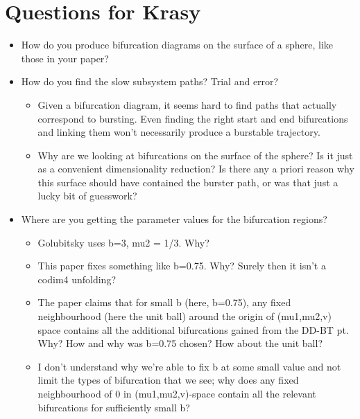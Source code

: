 \documentclass[11pt]{article}
\author{mark}
\date{\today}
\title{}
\begin{document}
\tableofcontents

\newpage
\section{Questions for Krasy}
\label{sec:org248f0c1}
\begin{itemize}
\item How do you produce bifurcation diagrams on the surface of a sphere, like those in your paper?

\item How do you find the slow subsystem paths? Trial and error?
\begin{itemize}
\item Given a bifurcation diagram, it seems hard to find paths that actually correspond to bursting. Even finding the right start and end bifurcations and linking them won't necessarily produce a burstable trajectory.
\item Why are we looking at bifurcations on the surface of the sphere? Is it just as a convenient dimensionality reduction? Is there any a priori reason why this surface should have contained the burster path, or was that just a lucky bit of guesswork?
\end{itemize}

\item Where are you getting the parameter values for the bifurcation regions?
\begin{itemize}
\item Golubitsky uses b=3, mu2 = 1/3. Why?
\item This paper fixes something like b=0.75. Why? Surely then it isn't a codim4 unfolding?
\item The paper claims that for small b (here, b=0.75), any fixed neighbourhood (here the unit ball) around the origin of (mu1,mu2,v) space contains all the additional bifurcations gained from the DD-BT pt. Why? How and why was b=0.75 chosen? How about the unit ball?
\item I don't understand why we're able to fix b at some small value and not limit the types of bifurcation that we see; why does any fixed neighbourhood of 0 in (mu1,mu2,v)-space contain all the relevant bifurcations for sufficiently small b?
\end{itemize}


\end{itemize}
\end{document}
